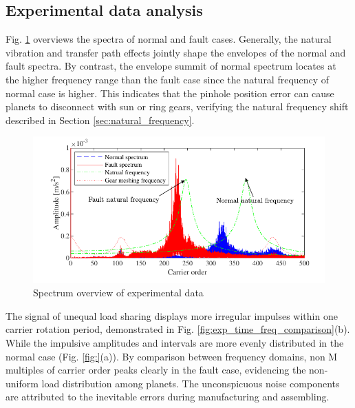 \documentclass[a4paper,fleqn]{cas-sc}%
\begin{document}
\subsection{Experimental data analysis}
\par Fig. \ref{fig:exp_natural_frequency_shift} overviews the spectra of normal and fault cases. Generally, the natural vibration and transfer path effects jointly shape the envelopes of the normal and fault spectra. By contrast, the envelope summit of normal spectrum locates at the higher frequency range than the fault case since the natural frequency of normal case is higher. This indicates that the pinhole position error can cause planets to disconnect with sun or ring gears, verifying the natural frequency shift described in Section \ref{sec:natural_frequency}.
\begin{figure}[pos=htbp]
    \centering
    \includegraphics{Exp_natural_frequency_shift.pdf}
    \caption{Spectrum overview of experimental data}
    \label{fig:exp_natural_frequency_shift}
\end{figure}
\par The signal of unequal load sharing displays more irregular impulses within one carrier rotation period, demonstrated in Fig. \ref{fig:exp_time_freq_comparison}(b). While the impulsive amplitudes and intervals are more evenly distributed in the normal case (Fig. \ref{fig:}(a)). By comparison between frequency domains, non M multiples of carrier order peaks clearly in the fault case, evidencing the non-uniform load distribution among planets. The unconspicuous noise components are attributed to the inevitable errors during manufacturing and assembling.
\end{document}
